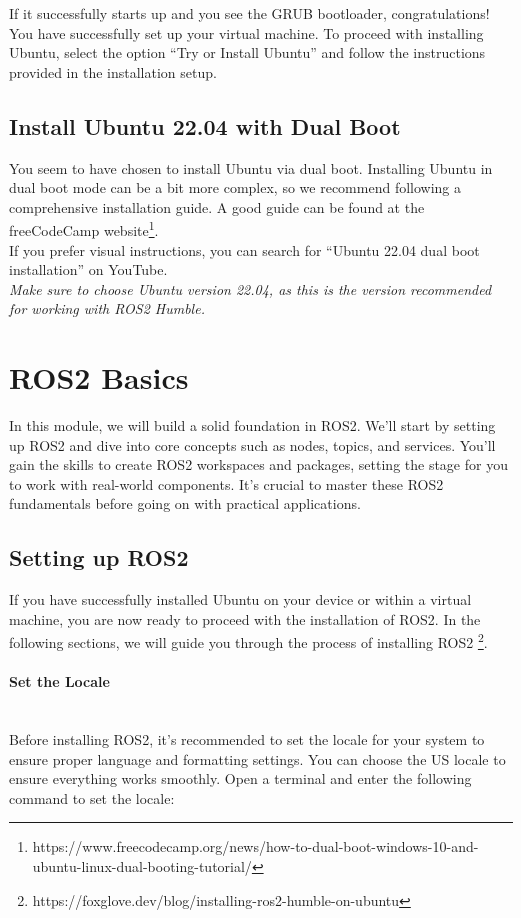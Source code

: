 \documentclass{article}
\begin{document}
\noindent
If it successfully starts up and you see the GRUB bootloader, congratulations! You have successfully set up your virtual machine. To proceed with installing Ubuntu, select the option “Try or Install Ubuntu” and follow the instructions provided in the installation setup.
        
\subsection{Install Ubuntu 22.04 with Dual Boot}
You seem to have chosen to install Ubuntu via dual boot. Installing Ubuntu in dual boot mode can be a bit more complex, so we recommend following a comprehensive installation guide. A good guide can be found at the freeCodeCamp website\footnote{https://www.freecodecamp.org/news/how-to-dual-boot-windows-10-and-ubuntu-linux-dual-booting-tutorial/}.\\
If you prefer visual instructions, you can search for “Ubuntu 22.04 dual boot installation” on YouTube.\\
\textit{Make sure to choose Ubuntu version 22.04, as this is the version recommended for working with ROS2 Humble.}

\newpage
\section{ROS2 Basics}
In this module, we will build a solid foundation in ROS2. We'll start by setting up ROS2 and dive into core concepts such as nodes, topics, and services. You'll gain the skills to create ROS2 workspaces and packages, setting the stage for you to work with real-world components. It's crucial to master these ROS2 fundamentals before going on with practical applications.

    
\subsection{Setting up ROS2}
If you have successfully installed Ubuntu on your device or within a virtual machine, you are now ready to proceed with the installation of ROS2. In the following sections, we will guide you through the process of installing ROS2 \footnote{https://foxglove.dev/blog/installing-ros2-humble-on-ubuntu}.

\paragraph{Set the Locale}~\\
Before installing ROS2, it's recommended to set the locale for your system to ensure proper language and formatting settings. You can choose the US locale to ensure everything works smoothly. Open a terminal and enter the following command to set the locale:
\end{document}
